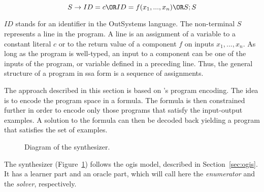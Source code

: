 \[S \to ID = c \OR ID = f(x_1, ..., x_n) \OR S;S\]

\noindent
$ID$ stands for an identifier in the OutSystems language. The non-terminal $S$
represents a line in the program. A line is an assignment of a variable to a
constant literal $c$ or to the return value of a component $f$ on inputs $x_1,
..., x_n$. As long as the program is well-typed, an input to a component can
be one of the inputs of the program, or variable defined in a preceding line.
Thus, the general structure of a program in \gls{ssa} form is a sequence of
assignments.

The approach described in this section is based on
\citeauthor{Jha:oracle:2010}'s program encoding. The idea is to encode the
program space in a formula. The formula is then constrained further in order to
encode only those programs that satisfy the input-output examples. A solution to
the formula can then be decoded back yielding a program that satisfies the set
of examples.

\begin{figure}
  \centering

  \caption{Diagram of the synthesizer.}
  \label{fig:synth-setwise}
\end{figure}

The synthesizer (Figure~\ref{fig:synth-setwise}) follows the \gls{ogis} model,
described in Section~\ref{sec:ogis}. It has a learner part and an oracle part,
which will call here the \textit{enumerator} and the \textit{solver},
respectively.

